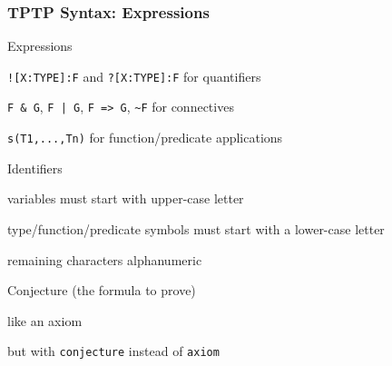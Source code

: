 \begin{frame}[fragile]\frametitle{TPTP Syntax: Expressions}
\begin{blockitems}{Expressions}
\item \lstinline|![X:TYPE]:F| and \lstinline|?[X:TYPE]:F| for quantifiers
\item \lstinline!F & G!, \lstinline!F | G!, \lstinline!F => G!, \lstinline!~F! for connectives
\item \lstinline|s(T1,...,Tn)| for function/predicate applications
\end{blockitems}

\begin{blockitems}{Identifiers}
\item variables must start with upper-case letter
\item type/function/predicate symbols must start with a lower-case letter
\item remaining characters alphanumeric
\end{blockitems}

\begin{blockitems}{Conjecture (the formula to prove)}
\item like an axiom
\item but with \lstinline|conjecture| instead of \lstinline|axiom|
\end{blockitems}
\end{frame}


